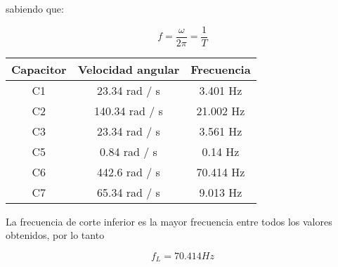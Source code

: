 \documentclass{article}
\begin{document}
sabiendo que: 

$$ f = \frac{\omega}{2\pi} = \frac{1}{T} $$

\begin{tabular}{|c|c|c|}
\hline
Capacitor & Velocidad angular & Frecuencia\\
\hline
C1 & 23.34 rad / s & 3.401 Hz\\
\hline
C2 & 140.34 rad / s & 21.002 Hz\\
\hline
C3 & 23.34 rad / s & 3.561 Hz\\
\hline
C5 & 0.84 rad / s & 0.14 Hz\\
\hline
C6 & 442.6 rad / s & 70.414 Hz\\
\hline
C7 & 65.34 rad / s & 9.013 Hz\\
\hline
\end{tabular}


La frecuencia de corte inferior es la mayor frecuencia entre todos los valores obtenidos, por lo tanto

$$ f_{L} = 70.414 Hz$$
\end{document}

